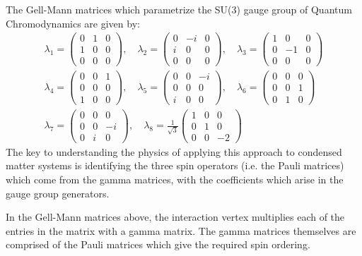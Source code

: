 \documentclass[prb,showpacs,superscriptaddress,titlepage,amsmath,amssymb,twocolumn]{revtex4-1}
\begin{document}
The Gell-Mann matrices which parametrize the SU(3) gauge group of Quantum Chromodynamics are given by:
\begin{multline}
\lambda_{1} = \begin{pmatrix}0&1 &0\\1&0&0\\0&0&0\end{pmatrix},\quad \lambda_{2} = \begin{pmatrix}0&-i&0\\i&0&0\\0&0&0\end{pmatrix}, \quad \lambda_{3} = \begin{pmatrix}1&0&0\\0&-1&0\\0&0&0\end{pmatrix}\\ \lambda_{4} = \begin{pmatrix}0&0&1\\0&0&0\\1&0&0\end{pmatrix}, \quad \lambda_{5} = \begin{pmatrix}0&0&-i\\0&0&0\\i&0&0\end{pmatrix}, \quad \lambda_{6} = \begin{pmatrix}0&0&0\\0&0&1\\0&1&0\end{pmatrix}\\ \lambda_{7} = \begin{pmatrix}0&0&0\\0&0&-i\\0&i&0\end{pmatrix}, \quad \lambda_{8} = \frac{1}{\sqrt{3}}\begin{pmatrix}1&0&0\\0&1&0\\0&0&-2\end{pmatrix}
\end{multline}
The key to understanding the physics of applying this approach to condensed matter systems is identifying the three spin operators (i.e. the Pauli matrices) which come from the gamma matrices, with the coefficients which arise in the gauge group generators. 

In the Gell-Mann matrices above, the interaction vertex multiplies each of the entries in the matrix with a gamma matrix. The gamma matrices themselves are comprised of the Pauli matrices which give the required spin ordering.
\end{document}
